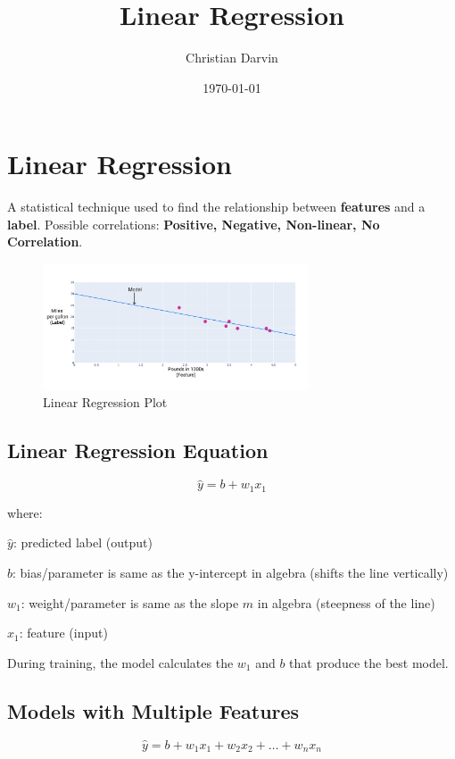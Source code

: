 \documentclass[a4paper,12pt]{article}
\title{Linear Regression}
\author{Christian Darvin}
\date{\today}
\begin{document}
\maketitle
\tableofcontents

\newpage

\section{Linear Regression}
A statistical technique used to find the relationship between \textbf{features} and a \textbf{label}. Possible correlations: \textbf{Positive, Negative, Non-linear, No Correlation}.
\begin{figure}[H]
    \centering
    \includegraphics[width=0.7\textwidth]{../Images/Linear-Regression/linear-regression-plot.png}
    \caption{Linear Regression Plot}
    \label{fig:linear-regression-plot}
\end{figure}

\subsection{Linear Regression Equation}

\begin{equation}
\hat{y} = b + w_1 x_1
\end{equation}

\noindent where:

$\hat{y}$: predicted label (output)

$b$: bias/parameter is same as the y-intercept in algebra (shifts the line vertically)
 
$w_1$: weight/parameter is same as the slope $m$ in algebra (steepness of the line)

$x_1$: feature (input) \newline

\noindent During training, the model calculates the $w_1$ and $b$ that produce the best model.

\subsection{Models with Multiple Features}
\begin{equation}
\hat{y} = b + w_1 x_1 + w_2 x_2 + \dots + w_n x_n
\end{equation}
\end{document}
